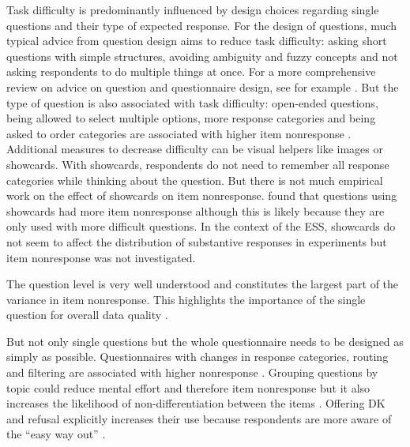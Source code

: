 \documentclass[a4paper,12pt]{article}
\begin{document}
Task difficulty is predominantly influenced by design choices regarding single questions and their type of expected response. For the design of questions, much typical advice from question design aims to reduce task difficulty: asking short questions with simple structures, avoiding ambiguity and fuzzy concepts and not asking respondents to do multiple things at once. For a more comprehensive review on advice on question and questionnaire design, see for example \citet{smythDesigningQuestionsQuestionnaires2016}. But the type of question is also associated with task difficulty: open-ended questions, being allowed to select multiple options, more response categories and being asked to order categories are associated with higher item nonresponse \citep{schumanOpenClosedQuestion1979, holbrookImpactQuestionRespondent2006, holbrookInterviewerErrorsHelp2016, olsonEffectsRespondentQuestion2019, silberEffectsQuestionRespondent2021}. Additional measures to decrease difficulty can be visual helpers like images or showcards. With showcards, respondents do not need to remember all response categories while thinking about the question. But there is not much empirical work on the effect of showcards on item nonresponse. \citet{holbrookInterviewerErrorsHelp2016} found that questions using showcards had more item nonresponse although this is likely because they are only used with more difficult questions. In the context of the ESS, showcards do not seem to affect the distribution of substantive responses in experiments \citep{jackleAssessingEffectData2010} but item nonresponse was not investigated.

The question level is very well understood and constitutes the largest part of the variance in item nonresponse. This highlights the importance of the single question for overall data quality \citep{olsonEffectsRespondentQuestion2019}.

But not only single questions but the whole questionnaire needs to be designed as simply
as possible. Questionnaires with changes in response categories, routing and filtering are associated with higher nonresponse \citep{messerDeterminantsItemNonresponse2012}. Grouping questions by topic could reduce mental effort and therefore item nonresponse but it also increases the likelihood of non-differentiation between the items \citep{krosnickResponseStrategiesCoping1991}. Offering DK and refusal explicitly increases their use because respondents are more aware of the “easy way out” \citep{schumanAssessmentNoOpinion1979, beattyAnswerNotAnwer2002}.
\end{document}
